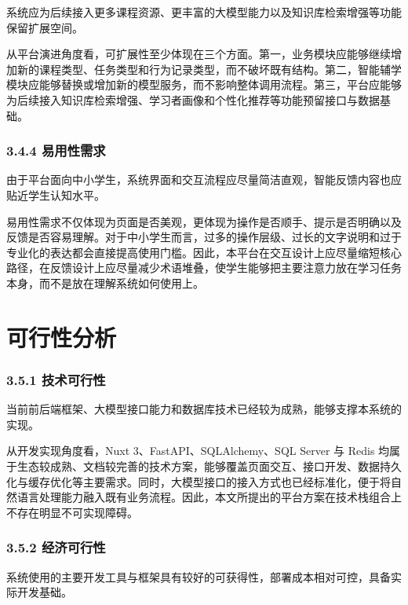 系统应为后续接入更多课程资源、更丰富的大模型能力以及知识库检索增强等功能保留扩展空间。

从平台演进角度看，可扩展性至少体现在三个方面。第一，业务模块应能够继续增加新的课程类型、任务类型和行为记录类型，而不破坏既有结构。第二，智能辅学模块应能够替换或增加新的模型服务，而不影响整体调用流程。第三，平台应能够为后续接入知识库检索增强、学习者画像和个性化推荐等功能预留接口与数据基础。

\subsubsection{3.4.4 易用性需求}\label{ux6613ux7528ux6027ux9700ux6c42}

由于平台面向中小学生，系统界面和交互流程应尽量简洁直观，智能反馈内容也应贴近学生认知水平。

易用性需求不仅体现为页面是否美观，更体现为操作是否顺手、提示是否明确以及反馈是否容易理解。对于中小学生而言，过多的操作层级、过长的文字说明和过于专业化的表达都会直接提高使用门槛。因此，本平台在交互设计上应尽量缩短核心路径，在反馈设计上应尽量减少术语堆叠，使学生能够把主要注意力放在学习任务本身，而不是放在理解系统如何使用上。

\section{可行性分析}\label{ux53efux884cux6027ux5206ux6790}

\subsubsection{3.5.1 技术可行性}\label{ux6280ux672fux53efux884cux6027}

当前前后端框架、大模型接口能力和数据库技术已经较为成熟，能够支撑本系统的实现。

从开发实现角度看，Nuxt 3、FastAPI、SQLAlchemy、SQL Server 与 Redis 均属于生态较成熟、文档较完善的技术方案，能够覆盖页面交互、接口开发、数据持久化与缓存优化等主要需求。同时，大模型接口的接入方式也已经标准化，便于将自然语言处理能力融入既有业务流程。因此，本文所提出的平台方案在技术栈组合上不存在明显不可实现障碍。

\subsubsection{3.5.2 经济可行性}\label{ux7ecfux6d4eux53efux884cux6027}

系统使用的主要开发工具与框架具有较好的可获得性，部署成本相对可控，具备实际开发基础。

